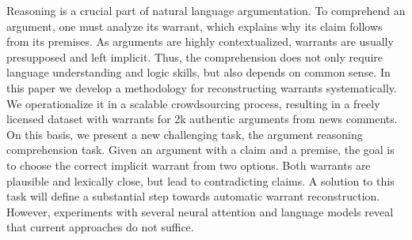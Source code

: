 Reasoning is a crucial part of natural language argumentation. To comprehend an argument, one must analyze its warrant, which explains why its claim follows from its premises. As arguments are highly contextualized, warrants are usually presupposed and left implicit. Thus, the comprehension does not only require language understanding and logic skills, but also depends on common sense. In this paper we develop a methodology for reconstructing warrants systematically. We operationalize it in a scalable crowdsourcing process, resulting in a freely licensed dataset with warrants for 2k authentic arguments from news comments. On this basis, we present a new challenging task, the argument reasoning comprehension task. Given an argument with a claim and a premise, the goal is to choose the correct implicit warrant from two options. Both warrants are plausible and lexically close, but lead to contradicting claims. A solution to this task will define a substantial step towards automatic warrant reconstruction. However, experiments with several neural attention and language models reveal that current approaches do not suffice.

